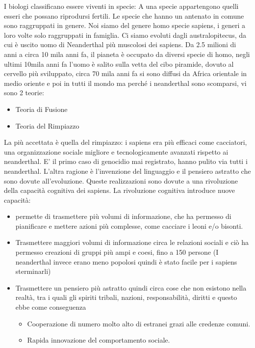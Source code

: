 \documentclass[11pt, a4page, twocolumn]{article}
\begin{document}
I biologi classificano essere viventi in specie: A una specie appartengono quelli esseri che possano riprodursi fertili. Le specie che hanno un antenato in comune sono raggruppati in genere. Noi siamo del genere homo specie sapiens, i generi a loro volte solo raggruppati in famiglia. Ci siamo evoluti dagli australopitecus, da cui è uscito uomo di Neanderthal più muscolosi dei sapiens. Da 2.5 milioni di anni a circa 10 mila anni fa, il pianeta è occupato da diversi specie di homo, negli ultimi 10mila anni fa l’uomo è salito sulla vetta del cibo piramide, dovuto al cervello più sviluppato, circa 70 mila anni fa si sono diffusi da Africa orientale in medio oriente e poi in tutti il mondo ma perché i neanderthal sono scomparsi, vi sono 2 teorie:
\begin{itemize}
    \item Teoria di Fusione
    \item Teoria del Rimpiazzo
\end{itemize}
La più accettata è quella del rimpiazzo: i sapiens era più efficaci come cacciatori, una organizzazione sociale migliore e tecnologicamente avanzati rispetto ai neanderthal. E’ il primo caso di genocidio mai registrato, hanno pulito via tutti i neanderthal. L’altra ragione è l’invenzione del linguaggio e il pensiero astratto che sono dovute all’evoluzione. Queste realizzazioni sono dovute a una rivoluzione della capacità cognitiva dei sapiens. 
La rivoluzione cognitiva introduce nuove capacità:
\begin{itemize}
    \item permette di trasmettere più volumi di informazione, che ha permesso di pianificare e mettere azioni più complesse, come cacciare i leoni e/o bisonti. 
    \item Trasmettere maggiori volumi di informazione circa le relazioni sociali e ciò ha permesso creazioni di gruppi più ampi e coesi, fino a 150 persone (I neanderthal invece erano meno popolosi quindi è stato facile per i sapiens sterminarli)
    \item Trasmettere un pensiero più astratto quindi circa cose che non esistono nella realtà, tra i quali gli spiriti tribali, nazioni, responsabilità, diritti e questo ebbe come conseguenza
    \begin{itemize}
        \item Cooperazione di numero molto alto di estranei grazi alle credenze comuni.
        \item Rapida innovazione del comportamento sociale.
    \end{itemize}
\end{itemize}
\end{document}
